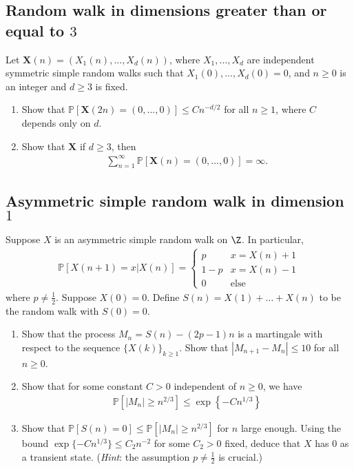 \documentclass[12pt,reqno]{amsart}
\theoremstyle{definition}
\theoremstyle{remark}
\numberwithin{equation}{section}
\begin{document}
\subsection{Random walk in dimensions greater than or equal to $3$}
Let $\mathbf{X}(n)=(X_{1}(n),\ldots,X_{d}(n))$, where $X_{1},\ldots,X_{d}$ are independent symmetric simple random walks such that $X_{1}(0),\ldots,X_{d}(0)=0$, and $n\geq0$ is an integer and $d\geq3$ is fixed.
\begin{enumerate}
\item Show that $\mathbb{P}[\mathbf{X}(2n)=(0,\ldots,0)]\leq Cn^{-d/2}$ for all $n\geq1$, where $C$ depends only on $d$.
\item Show that $\mathbf{X}$ if $d\geq3$, then 
%
\begin{align*}
\sum_{n=1}^{\infty}\mathbb{P}[\mathbf{X}(n)=(0,\ldots,0)]=\infty.
\end{align*}
%
\end{enumerate}
\subsection{Asymmetric simple random walk in dimension $1$}
Suppose $X$ is an asymmetric simple random walk on $\Z$. In particular, 
%
\begin{align*}
\mathbb{P}[X(n+1)=x|X(n)]=\begin{cases}p&x=X(n)+1\\1-p&x=X(n)-1\\0&\mathrm{else}\end{cases}
\end{align*}
%
where $p\neq\frac12$. Suppose $X(0)=0$. Define $S(n)=X(1)+\ldots+X(n)$ to be the random walk with $S(0)=0$.
\begin{enumerate}
\item Show that the process $M_{n}=S(n)-(2p-1)n$ is a martingale with respect to the sequence $\{X(k)\}_{k\geq1}$. Show that $|M_{n+1}-M_{n}|\leq 10$ for all $n\geq0$.
\item Show that for some constant $C>0$ independent of $n\geq0$, we have
%
\begin{align*}
\mathbb{P}\left[|M_{n}|\geq n^{2/3}\right]\leq \exp\left\{-Cn^{1/3}\right\}
\end{align*}
%
\item Show that $\mathbb{P}[S(n)=0]\leq\mathbb{P}[|M_{n}|\geq n^{2/3}]$ for $n$ large enough. Using the bound $\exp\{-Cn^{1/3}\}\leq C_{2}n^{-2}$ for some $C_{2}>0$ fixed, deduce that $X$ has $0$ as a transient state. (\emph{Hint}: the assumption $p\neq\frac12$ is crucial.)
\end{enumerate}
\end{document}

